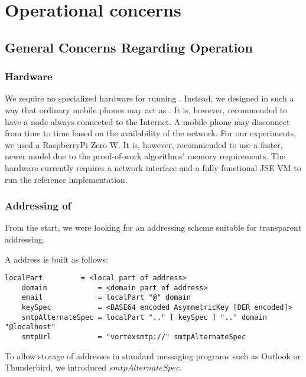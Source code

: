 \part{Operational concerns}\label{sec:operation}

\chapter{General Concerns Regarding Operation}
\section{Hardware}
We require no specialized hardware for running \VortexNodes. Instead, we designed \MessageVortex{} in such a way that ordinary mobile phones may act as \VortexNodes. It is, however, recommended to have a node always connected to the Internet. A mobile phone may disconnect from time to time based on the availability of the network. For our experiments, we used a RaspberryPi Zero W. It is, however, recommended to use a faster, newer model due to the proof-of-work algorithms' memory requirements. The hardware currently requires a network interface and a fully functional JSE VM to run the reference implementation.

\section{Addressing of \VortexNodes}
From the start, we were looking for an addressing scheme suitable for transparent addressing.

A \MessageVortex{} address is built as follows: 

\begin{lstlisting}[language=EBNF]
	localPart         = <local part of address>
	domain            = <domain part of address>
	email             = localPart "@" domain
	keySpec           = <BASE64 encoded AsymmetricKey [DER encoded]>
	smtpAlternateSpec = localPart ".." [ keySpec ] ".." domain "@localhost"
	smtpUrl           = "vortexsmtp://" smtpAlternateSpec
\end{lstlisting}

To allow storage of \MessageVortex{} addresses in standard messaging programs such as Outlook or Thunderbird, we introduced $smtpAlternateSpec$. 

